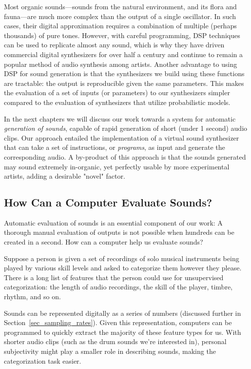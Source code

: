 \documentclass[\main/thesis.tex]{subfiles}
\begin{document}
 Most organic sounds---sounds from the natural environment, and its flora and fauna---are much more complex than the output of a single oscillator. In such cases, their digital approximation requires a combination of multiple (perhaps thousands) of pure tones. However, with careful programming, DSP techniques can be used to replicate almost any sound, which is why they have driven commercial digital synthesizers for over half a century \cite{jenkins2019analog} and continue to remain a popular method of audio synthesis among artists. Another advantage to using DSP for sound generation is that the synthesizers we build using these functions are tractable: the output is reproducible given the same parameters. This makes the evaluation of a set of inputs (or parameters) to our synthesizers simpler compared to the evaluation of synthesizers that utilize probabilistic models.
 
In the next chapters we will discuss our work towards a system for automatic \textit{generation of sounds}, capable of rapid generation of short (under 1 second) audio clips. Our approach entailed the implementation of a virtual sound synthesizer that can take a set of instructions, or \textit{programs}, as input and generate the corresponding audio. A by-product of this approach is that the sounds generated may sound extremely in-organic, yet perfectly usable by more experimental artists, adding a desirable "novel" factor. 



\subsection{How Can a Computer Evaluate Sounds?}
Automatic evaluation of sounds is an essential component of our work: A thorough manual evaluation of outputs is not possible when hundreds can be created in a second. How can a computer help us evaluate sounds?

Suppose a person is given a set of recordings of solo musical instruments being played by various skill levels and asked to categorize them however they please. There is a long list of features that the person could use for unsupervised categorization: the length of audio recordings, the skill of the player, timbre, rhythm, and so on. 

Sounds can be represented digitally as a series of numbers (discussed further in Section~\ref{sec_sampling_rates}). Given this representation, computers can be programmed to quickly extract the majority of these feature types for us. With shorter audio clips (such as the drum sounds we're interested in), personal subjectivity might play a smaller role in describing sounds, making the categorization task easier.
\end{document}
